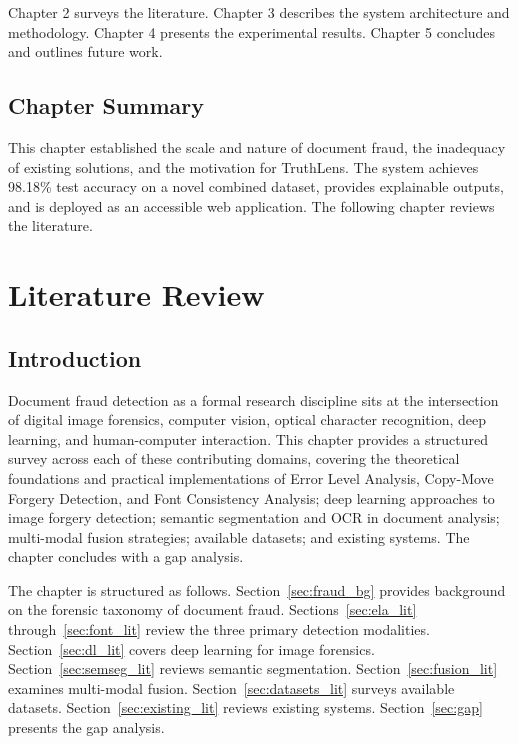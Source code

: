 \documentclass[12pt,a4paper,oneside]{report}
\begin{document}
Chapter 2 surveys the literature. Chapter 3 describes the system architecture
and methodology. Chapter 4 presents the experimental results. Chapter 5
concludes and outlines future work.

\section{Chapter Summary}

This chapter established the scale and nature of document fraud, the inadequacy
of existing solutions, and the motivation for TruthLens. The system achieves
98.18\% test accuracy on a novel combined dataset, provides explainable outputs,
and is deployed as an accessible web application. The following chapter reviews
the literature.

\chapter{Literature Review}
\label{chap:literature}

\section{Introduction}

Document fraud detection as a formal research discipline sits at the
intersection of digital image forensics, computer vision, optical character
recognition, deep learning, and human-computer interaction. This chapter
provides a structured survey across each of these contributing domains,
covering the theoretical foundations and practical implementations of Error
Level Analysis, Copy-Move Forgery Detection, and Font Consistency Analysis;
deep learning approaches to image forgery detection; semantic segmentation
and OCR in document analysis; multi-modal fusion strategies; available datasets;
and existing systems. The chapter concludes with a gap analysis.

The chapter is structured as follows. Section~\ref{sec:fraud_bg} provides
background on the forensic taxonomy of document fraud.
Sections~\ref{sec:ela_lit} through~\ref{sec:font_lit} review the three primary
detection modalities. Section~\ref{sec:dl_lit} covers deep learning for image
forensics. Section~\ref{sec:semseg_lit} reviews semantic segmentation.
Section~\ref{sec:fusion_lit} examines multi-modal fusion.
Section~\ref{sec:datasets_lit} surveys available datasets.
Section~\ref{sec:existing_lit} reviews existing systems.
Section~\ref{sec:gap} presents the gap analysis.
\end{document}

